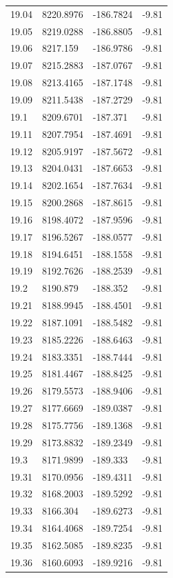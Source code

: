 \begin{table}[H]
\begin{tabular}{llll}
19.04 & 8220.8976 & -186.7824 & -9.81 \\
19.05 & 8219.0288 & -186.8805 & -9.81 \\
19.06 & 8217.159 & -186.9786 & -9.81 \\
19.07 & 8215.2883 & -187.0767 & -9.81 \\
19.08 & 8213.4165 & -187.1748 & -9.81 \\
19.09 & 8211.5438 & -187.2729 & -9.81 \\
19.1 & 8209.6701 & -187.371 & -9.81 \\
19.11 & 8207.7954 & -187.4691 & -9.81 \\
19.12 & 8205.9197 & -187.5672 & -9.81 \\
19.13 & 8204.0431 & -187.6653 & -9.81 \\
19.14 & 8202.1654 & -187.7634 & -9.81 \\
19.15 & 8200.2868 & -187.8615 & -9.81 \\
19.16 & 8198.4072 & -187.9596 & -9.81 \\
19.17 & 8196.5267 & -188.0577 & -9.81 \\
19.18 & 8194.6451 & -188.1558 & -9.81 \\
19.19 & 8192.7626 & -188.2539 & -9.81 \\
19.2 & 8190.879 & -188.352 & -9.81 \\
19.21 & 8188.9945 & -188.4501 & -9.81 \\
19.22 & 8187.1091 & -188.5482 & -9.81 \\
19.23 & 8185.2226 & -188.6463 & -9.81 \\
19.24 & 8183.3351 & -188.7444 & -9.81 \\
19.25 & 8181.4467 & -188.8425 & -9.81 \\
19.26 & 8179.5573 & -188.9406 & -9.81 \\
19.27 & 8177.6669 & -189.0387 & -9.81 \\
19.28 & 8175.7756 & -189.1368 & -9.81 \\
19.29 & 8173.8832 & -189.2349 & -9.81 \\
19.3 & 8171.9899 & -189.333 & -9.81 \\
19.31 & 8170.0956 & -189.4311 & -9.81 \\
19.32 & 8168.2003 & -189.5292 & -9.81 \\
19.33 & 8166.304 & -189.6273 & -9.81 \\
19.34 & 8164.4068 & -189.7254 & -9.81 \\
19.35 & 8162.5085 & -189.8235 & -9.81 \\
19.36 & 8160.6093 & -189.9216 & -9.81 \\

\end{tabular}
\end{table}
